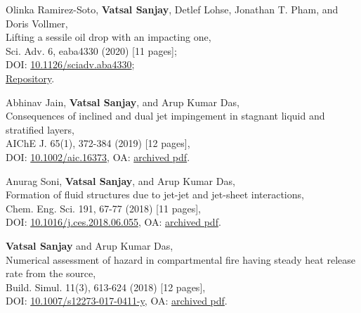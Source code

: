 	\item Olinka Ramirez-Soto, \textbf{Vatsal Sanjay}, Detlef Lohse, Jonathan T. Pham, and Doris Vollmer,\\
	Lifting a sessile oil drop with an impacting one,\\
	Sci. Adv. 6, eaba4330 (2020) [11 pages];\\
	\faFile\hspace{0.2em}DOI: \href{https://doi.org/10.1126/sciadv.aba4330}{10.1126/sciadv.aba4330};\\
	\faGithub\hspace{0.2em}\href{https://github.com/VatsalSy/Lifting-a-sessile-drop}{Repository}.

	\item Abhinav Jain, \textbf{Vatsal Sanjay}, and Arup Kumar Das,\\
	Consequences of inclined and dual jet impingement in stagnant liquid and stratified layers,\\
	AIChE J. 65(1), 372-384 (2019) [12 pages],\\
	\faLock\hspace{0.2em}DOI: \href{https://doi.org/10.1002/aic.16373}{10.1002/aic.16373}, \faFile\hspace{0.2em}OA: \href{https://tinyurl.com/24p5dy8s}{archived pdf}.

	\item Anurag Soni, \textbf{Vatsal Sanjay}, and Arup Kumar Das,\\
	Formation of fluid structures due to jet-jet and jet-sheet interactions,\\
	Chem. Eng. Sci. 191, 67-77 (2018) [11 pages],\\
	\faLock\hspace{0.2em}DOI: \href{https://doi.org/10.1016/j.ces.2018.06.055}{10.1016/j.ces.2018.06.055}, \faFile\hspace{0.2em}OA: \href{https://tinyurl.com/2bv5fznd}{archived pdf}.

	\item \textbf{Vatsal Sanjay} and Arup Kumar Das,\\
	Numerical assessment of hazard in compartmental fire having steady heat release rate from the source,\\
	Build. Simul. 11(3), 613-624 (2018) [12 pages],\\
	\faLock\hspace{0.2em}DOI: \href{https://doi.org/10.1007/s12273-017-0411-y}{10.1007/s12273-017-0411-y}, \faFile\hspace{0.2em}OA: \href{https://tinyurl.com/2bwhzlzv}{archived pdf}.

